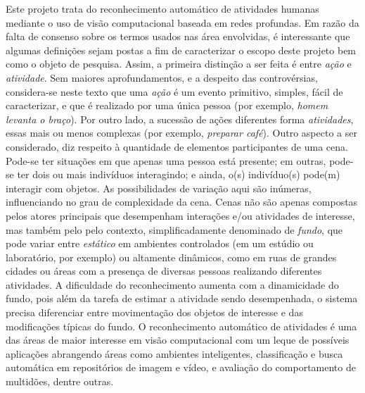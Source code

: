 \nocite{jegham-2020, hussain-2020,yao-2019,kongr-2018,herath-2017}
Este projeto trata do reconhecimento automático de atividades humanas mediante o uso de visão computacional baseada em redes profundas. Em razão da falta de consenso sobre os termos usados nas área envolvidas, é interessante que algumas definições sejam postas a fim de caracterizar o escopo deste projeto bem como o objeto de pesquisa. 
%
Assim, a primeira distinção a ser feita é entre \emph{ação} e \emph{atividade}. Sem maiores aprofundamentos, e a despeito das controvérsias, considera-se neste texto que uma \emph{ação} é um evento primitivo, simples, fácil de caracterizar, e que é realizado por uma única pessoa (por exemplo, \emph{homem levanta o braço}). Por outro lado, a sucessão de ações diferentes forma \emph{atividades}, essas mais ou menos complexas (por exemplo, \emph{preparar café}). 
%
Outro aspecto a ser considerado, diz respeito à quantidade de elementos participantes de uma cena. Pode-se ter situações em que apenas uma pessoa está presente; em outras, pode-se ter dois ou mais indivíduos interagindo; e ainda, o(s) indivíduo(s) pode(m) interagir com objetos. As possibilidades de variação aqui são inúmeras, influenciando no grau de complexidade da cena.
%
Cenas não são apenas compostas pelos atores principais que desempenham interações e/ou atividades de interesse, mas também pelo pelo contexto, simplificadamente denominado de \emph{fundo}, que pode variar entre \emph{estático} em ambientes controlados (em um estúdio ou laboratório, por exemplo) ou altamente dinâmicos, como em ruas de grandes cidades ou áreas com a presença de diversas pessoas realizando diferentes atividades. A dificuldade do reconhecimento aumenta com a dinamicidade do fundo, pois além da tarefa de estimar a atividade sendo desempenhada, o sistema precisa diferenciar entre movimentação dos objetos de interesse e das modificações típicas do fundo.
%
O reconhecimento automático de atividades é uma das áreas de maior interesse em visão computacional com um leque de possíveis aplicações abrangendo áreas como ambientes inteligentes, classificação e busca automática em repositórios de imagem e vídeo, e avaliação do comportamento de multidões, dentre outras.
